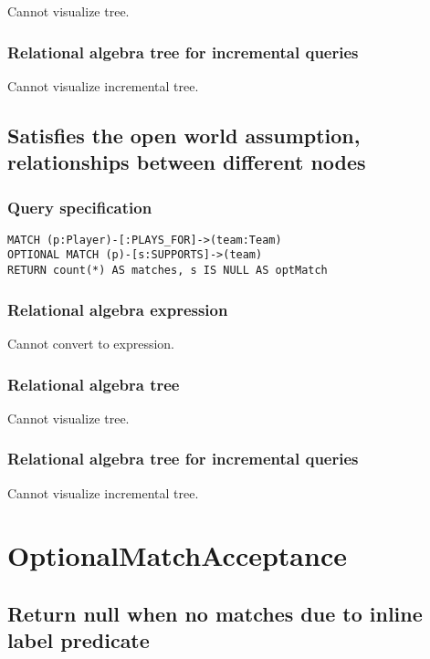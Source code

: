 Cannot visualize tree.

\subsubsection*{Relational algebra tree for incremental queries}

Cannot visualize incremental tree.

\subsection{Satisfies the open world assumption, relationships between different nodes}

\subsubsection*{Query specification}

\begin{lstlisting}
MATCH (p:Player)-[:PLAYS_FOR]->(team:Team)
OPTIONAL MATCH (p)-[s:SUPPORTS]->(team)
RETURN count(*) AS matches, s IS NULL AS optMatch
\end{lstlisting}

\subsubsection*{Relational algebra expression}

Cannot convert to expression.

\subsubsection*{Relational algebra tree}

Cannot visualize tree.

\subsubsection*{Relational algebra tree for incremental queries}

Cannot visualize incremental tree.

\section{OptionalMatchAcceptance}

\subsection{Return null when no matches due to inline label predicate}

